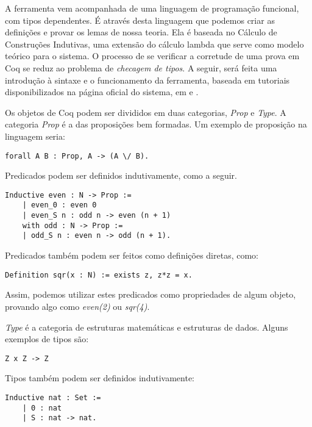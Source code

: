 A ferramenta vem acompanhada de uma linguagem de programação funcional, com
tipos dependentes. É através desta linguagem que podemos criar as definições e
provar os lemas de nossa teoria. Ela é baseada no Cálculo de Construções
Indutivas, uma extensão do cálculo lambda que serve como modelo teórico para o
sistema. O processo de se verificar a corretude de uma prova em Coq se reduz ao
problema de \emph{checagem de tipos}. A seguir, será feita uma introdução à
sintaxe e o funcionamento da ferramenta, baseada em tutoriais disponibilizados
na página oficial do sistema, em \cite{coq} e \cite{coq2}.


Os objetos de Coq podem ser divididos em duas categorias, \emph{Prop} e
\emph{Type}. A categoria \emph{Prop} é a das proposições bem formadas. Um
exemplo de proposição na linguagem seria:

\begin{lstlisting}[basicstyle=\small]
    forall A B : Prop, A -> (A \/ B).
\end{lstlisting}

Predicados podem ser definidos indutivamente, como a seguir.

\begin{lstlisting}[basicstyle=\small]
    Inductive even : N -> Prop :=
    | even_0 : even 0
    | even_S n : odd n -> even (n + 1)
    with odd : N -> Prop :=
    | odd_S n : even n -> odd (n + 1).
\end{lstlisting}

Predicados também podem ser feitos como definições diretas, como:

\begin{lstlisting}[basicstyle=\small]
    Definition sqr(x : N) := exists z, z*z = x.
\end{lstlisting}

Assim, podemos utilizar estes predicados como propriedades de algum objeto,
provando algo como \emph{even(2)} ou \emph{sqr(4)}.

\emph{Type} é a categoria de estruturas matemáticas e estruturas de dados.
Alguns exemplos de tipos são:

\begin{lstlisting}[basicstyle=\small]
    Z x Z -> Z
\end{lstlisting}

Tipos também podem ser definidos indutivamente:

\begin{lstlisting}[basicstyle=\small]
    Inductive nat : Set :=
    | 0 : nat
    | S : nat -> nat.
\end{lstlisting}

